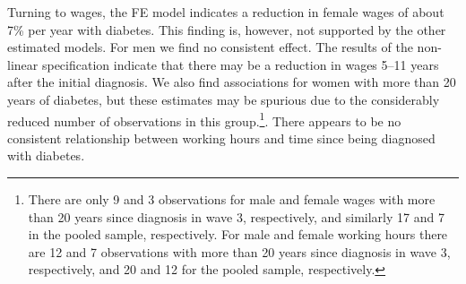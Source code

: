 \documentclass[12pt,english]{article}
\begin{document}
Turning to wages, the \ac{FE} model indicates a reduction in female wages of about 7\% per year with diabetes. This finding is, however, not supported by the other estimated models. For men we find no consistent effect. The results of the non-linear specification indicate that there may be a reduction in wages 5--11 years after the initial diagnosis. We also find associations for women with more than 20 years of diabetes, but these estimates may be spurious due to the considerably reduced number of observations in this group.\footnote{There are only 9 and 3 observations for male and female wages with more than 20 years since diagnosis in wave 3, respectively, and similarly 17 and 7 in the pooled sample, respectively. For male and female working hours there are 12 and 7 observations with more than 20 years since diagnosis in wave 3, respectively, and 20 and 12 for the pooled sample, respectively.}. There appears to be no consistent relationship between working hours and time since being diagnosed with diabetes.
\end{document}
